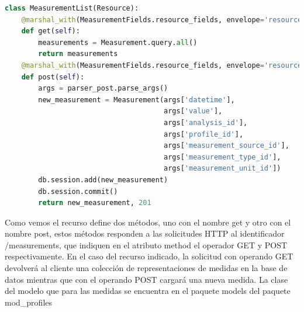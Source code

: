 \documentclass[a4paper,12pt]{article}
\begin{document}
\begin{itemize}
\begin{lstlisting}[language=Python]
class MeasurementList(Resource):
    @marshal_with(MeasurementFields.resource_fields, envelope='resource')
    def get(self):
        measurements = Measurement.query.all()
        return measurements
    @marshal_with(MeasurementFields.resource_fields, envelope='resource')
    def post(self):
        args = parser_post.parse_args()
        new_measurement = Measurement(args['datetime'],
                                      args['value'],
                                      args['analysis_id'],
                                      args['profile_id'],
                                      args['measurement_source_id'],
                                      args['measurement_type_id'],
                                      args['measurement_unit_id'])
        db.session.add(new_measurement)
        db.session.commit()
        return new_measurement, 201
\end{lstlisting}
Como vemos el recurso define dos métodos, uno con el nombre get y otro con el nombre post, estos métodos responden a las solicitudes HTTP al identificador /measurements, que indiquen en el atributo method el operador GET y POST respectivamente. En el caso del recurso indicado, la solicitud con operando GET devolverá al cliente una colección de representaciones de medidas en la base de datos mientras que con el operando POST cargará una nueva medida. La clase del modelo que para las medidas se encuentra en el paquete models del paquete mod\_profiles


\end{itemize}
\end{document}
